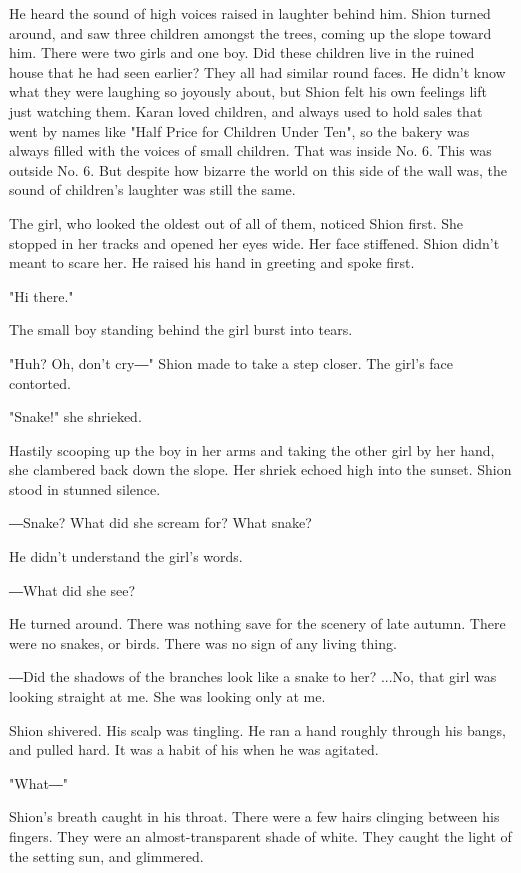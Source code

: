 He heard the sound of high voices raised in laughter behind him. Shion
turned around, and saw three children amongst the trees, coming up the
slope toward him. There were two girls and one boy. Did these children
live in the ruined house that he had seen earlier? They all had similar
round faces. He didn't know what they were laughing so joyously about,
but Shion felt his own feelings lift just watching them. Karan loved
children, and always used to hold sales that went by names like "Half
Price for Children Under Ten", so the bakery was always filled with the
voices of small children. That was inside No. 6. This was outside No. 6.
But despite how bizarre the world on this side of the wall was, the
sound of children's laughter was still the same.

The girl, who looked the oldest out of all of them, noticed Shion first.
She stopped in her tracks and opened her eyes wide. Her face stiffened.
Shion didn't meant to scare her. He raised his hand in greeting and
spoke first.

"Hi there."

The small boy standing behind the girl burst into tears.

"Huh? Oh, don't cry―" Shion made to take a step closer. The girl's face
contorted.

"Snake!" she shrieked.

Hastily scooping up the boy in her arms and taking the other girl by her
hand, she clambered back down the slope. Her shriek echoed high into the
sunset. Shion stood in stunned silence.

―Snake? What did she scream for? What snake?

He didn't understand the girl's words.

―What did she see?

He turned around. There was nothing save for the scenery of late autumn.
There were no snakes, or birds. There was no sign of any living thing.

―Did the shadows of the branches look like a snake to her? ...No, that
girl was looking straight at me. She was looking only at me.

Shion shivered. His scalp was tingling. He ran a hand roughly through
his bangs, and pulled hard. It was a habit of his when he was agitated.

"What―"

Shion's breath caught in his throat. There were a few hairs clinging
between his fingers. They were an almost-transparent shade of white.
They caught the light of the setting sun, and glimmered.

